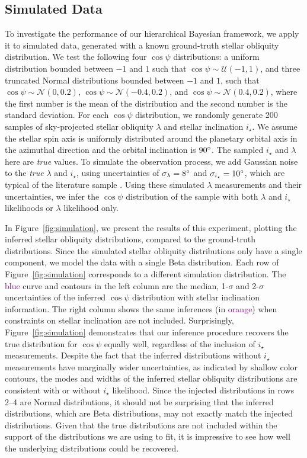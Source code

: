 \documentclass[twocolumn,times,linenumbers]{aastex631}
\newcommand{\edits}[1]{\textcolor{purple}{#1}}
\begin{document}
\subsection{Simulated Data}\label{subsec:sim}
To investigate the performance of our hierarchical Bayesian framework, we apply it to simulated data, generated with a known ground-truth stellar obliquity distribution.
We test the following four $\cos{\psi}$ distributions: a uniform distribution bounded between $-1$ and $1$ such that $\cos{\psi} \sim \mathcal{U}(-1,1)$, and three truncated Normal distributions bounded between $-1$ and $1$, such that $\cos{\psi} \sim \mathcal{N}(0, 0.2)$, $\cos{\psi} \sim \mathcal{N}(-0.4, 0.2)$, and $\cos{\psi} \sim \mathcal{N}(0.4, 0.2)$, where the first number is the mean of the distribution and the second number is the standard deviation.
For each $\cos{\psi}$ distribution, we randomly generate 200 samples of sky-projected stellar obliquity $\lambda$ and stellar inclination $i_\star$. We assume the stellar spin axis is uniformly distributed around the planetary orbital axis in the azimuthal direction and the orbital inclination is $90\mbox{$^\circ$}$.
The sampled $i_\star$ and $\lambda$ here are \emph{true} values. 
To simulate the observation process, we add Gaussian noise to the \emph{true} $\lambda$ and $i_\star$, using uncertainties of $\sigma_{\lambda} = 8\mbox{$^\circ$}$ and $\sigma_{i_\star} = 10\mbox{$^\circ$}$, which are typical of the literature sample \cite{Albrecht22}.
Using these simulated $\lambda$ measurements and their uncertainties, we infer the $\cos{\psi}$ distribution of the sample with both $\lambda$ and $i_\star$ likelihoods or $\lambda$ likelihood only.

In Figure~\ref{fig:simulation}, we present the results of this experiment, plotting the inferred stellar obliquity distributions, compared to the ground-truth distributions.
Since the simulated stellar obliquity distributions only have a single component, we model the data with a single Beta distribution.
Each row of Figure~\ref{fig:simulation} corresponds to a different simulation distribution. The \edits{blue} curve and contours in the left column are the median, 1-$\sigma$ and 2-$\sigma$ uncertainties of the inferred $\cos{\psi}$ distribution with stellar inclination information.
The right column shows the same inferences (in \edits{orange}) when constraints on stellar inclination are not included.
Surprisingly, Figure~\ref{fig:simulation} demonstrates that our inference procedure recovers the true distribution for $\cos{\psi}$ equally well, regardless of the inclusion of $i_\star$ measurements.
Despite the fact that the inferred distributions without $i_\star$ measurements have marginally wider uncertainties, as indicated by shallow color contours, the modes and widths of the inferred stellar obliquity distributions are consistent with or without $i_\star$ likelihood.
Since the injected distributions in rows 2--4 are Normal distributions, it should not be surprising that the inferred distributions, which are Beta distributions, may not exactly match the injected distributions. Given that the true distributions are not included within the support of the distributions we are using to fit, it is impressive to see how well the underlying distributions could be recovered.
\end{document}
